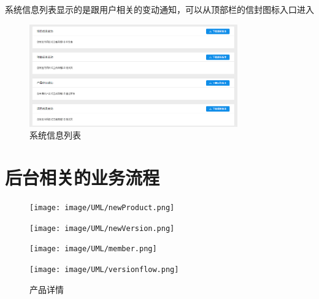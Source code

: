 系统信息列表显示的是跟用户相关的变动通知，可以从顶部栏的信封图标入口进入
\begin{figure}[h]
	\centering
	\includegraphics[width=0.8\textwidth]{image/result/message.png}
	\caption{系统信息列表}
	\label{fig:message}
\end{figure}
\section{后台相关的业务流程}
\begin{figure}[h]
	\centering
	\texttt{[image: image/UML/newProduct.png]}
	
	\texttt{[image: image/UML/newVersion.png]}
	
	\texttt{[image: image/UML/member.png]}
	
	\texttt{[image: image/UML/versionflow.png]}
	\caption{产品详情}
	\label{fig:detail}
\end{figure}